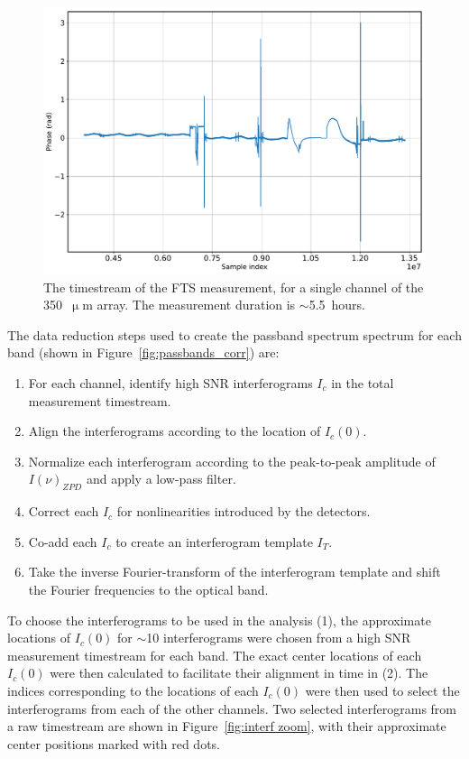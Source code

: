 \begin{figure}[!htbp]
\centering
\includegraphics[width=\textwidth]{figures/blast_data/fts/fts_long_raw}
\caption{The timestream of the FTS measurement, for a single channel of the 350~$\upmu$m array. The measurement duration is $\sim$5.5~hours.}
\label{fig:fts total meas}
\end{figure}

The data reduction steps used to create the passband spectrum spectrum for each band (shown in Figure~\ref{fig:passbands_corr}) are:

\begin{enumerate}[nosep]
  \item For each channel, identify high SNR interferograms $I_{c}$ in the total measurement timestream.
  \item Align the interferograms according to the location of $I_{c}(0)$.
  \item Normalize each interferogram according to the peak-to-peak amplitude of $I(\nu)_{ZPD}$ and apply a low-pass filter.
  \item Correct each $I_{c}$ for nonlinearities introduced by the detectors.
  \item Co-add each $I_{c}$ to create an interferogram template $I_{T}$.
  \item Take the inverse Fourier-transform of the interferogram template and shift the Fourier frequencies to the optical band.
\end{enumerate}

To choose the interferograms to be used in the analysis (1), the approximate locations of $I_{c}(0)$ for $\sim$10 interferograms were chosen from a high SNR measurement timestream for each band. The exact center locations of each $I_{c}(0)$ were then calculated to facilitate their alignment in time in (2). The indices corresponding to the locations of each $I_{c}(0)$ were then used to select the interferograms from each of the other channels. Two selected interferograms from a raw timestream are shown in Figure~\ref{fig:interf zoom}, with their approximate center positions marked with red dots.

